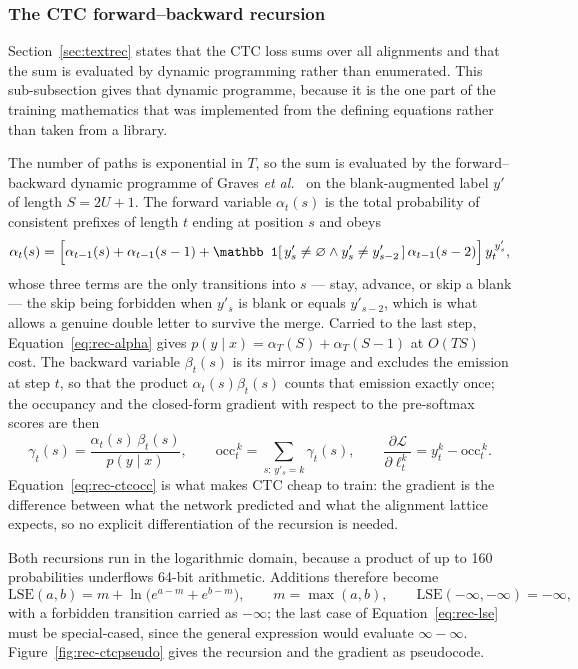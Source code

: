 \subsubsection{The CTC forward--backward recursion}

Section~\ref{sec:textrec} states that the CTC loss sums over all alignments and that the sum is evaluated by dynamic programming rather than enumerated.
This sub-subsection gives that dynamic programme, because it is the one part of the training mathematics that was implemented from the defining equations rather than taken from a library.

The number of paths is exponential in $T$, so the sum is evaluated by the forward--backward dynamic programme of Graves \emph{et al.}~\cite[p.~372]{graves2006} on the blank-augmented label $y'$ of length $S=2U+1$.
The forward variable $\alpha_t(s)$ is the total probability of consistent prefixes of length $t$ ending at position $s$ and obeys
\begin{equation}
\alpha_t(s)=\Bigl[\alpha_{t-1}(s)+\alpha_{t-1}(s-1)+\mathbb 1[\,y'_s\ne\varnothing\wedge y'_s\ne y'_{s-2}\,]\,\alpha_{t-1}(s-2)\Bigr]\,y_t^{\,y'_s},\label{eq:rec-alpha}
\end{equation}
whose three terms are the only transitions into $s$ --- stay, advance, or skip a blank --- the skip being forbidden when $y'_s$ is blank or equals $y'_{s-2}$, which is what allows a genuine double letter to survive the merge.
Carried to the last step, Equation~\ref{eq:rec-alpha} gives $p(y\mid x)=\alpha_T(S)+\alpha_T(S-1)$ at $O(TS)$ cost.
The backward variable $\beta_t(s)$ is its mirror image and excludes the emission at step $t$, so that the product $\alpha_t(s)\beta_t(s)$ counts that emission exactly once; the occupancy and the closed-form gradient with respect to the pre-softmax scores are then
\begin{equation}
\gamma_t(s)=\frac{\alpha_t(s)\,\beta_t(s)}{p(y\mid x)},\qquad \mathrm{occ}_t^{\,k}=\sum_{s:\,y'_s=k}\gamma_t(s),\qquad \frac{\partial\mathcal L}{\partial\ell_t^{k}}=y_t^k-\mathrm{occ}_t^{\,k}.\label{eq:rec-ctcocc}
\end{equation}
Equation~\ref{eq:rec-ctcocc} is what makes CTC cheap to train: the gradient is the difference between what the network predicted and what the alignment lattice expects, so no explicit differentiation of the recursion is needed.

Both recursions run in the logarithmic domain, because a product of up to 160 probabilities underflows 64-bit arithmetic.
Additions therefore become
\begin{equation}
\mathrm{LSE}(a,b)=m+\ln\bigl(e^{a-m}+e^{b-m}\bigr),\qquad m=\max(a,b),\qquad \mathrm{LSE}(-\infty,-\infty)=-\infty,\label{eq:rec-lse}
\end{equation}
with a forbidden transition carried as $-\infty$; the last case of Equation~\ref{eq:rec-lse} must be special-cased, since the general expression would evaluate $\infty-\infty$.
Figure~\ref{fig:rec-ctcpseudo} gives the recursion and the gradient as pseudocode.

